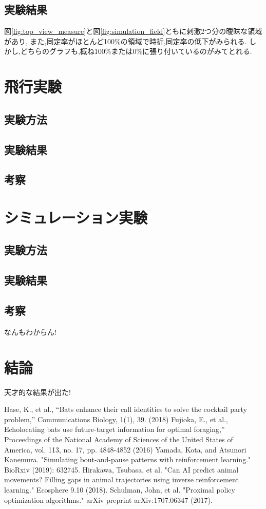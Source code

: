 \documentclass{jsreport}
\begin{document}
\newpage
\section{実験結果}
  図\ref{fig:top_view_measure}と図\ref{fig:simulation_field}ともに刺激2つ分の曖昧な領域があり,
  また,同定率がほとんど100\%の領域で時折,同定率の低下がみられる.
  しかし,どちらのグラフも,概ね100\%または0\%に張り付いているのがみてとれる.

\newpage
\chapter{飛行実験}
\section{実験方法}
\section{実験結果}
\section{考察}

\newpage
\chapter{シミュレーション実験}
\section{実験方法}
\section{実験結果}
\section{考察}
なんもわからん!

\newpage
\chapter{結論}
天才的な結果が出た!

\begin{thebibliography}{99}
    Hase, K., et al., “Bats enhance their call identities to solve the cocktail party problem,” Communications Biology, 1(1), 39. (2018)
    Fujioka, E., et al., Echolocating bats use future-target information for optimal foraging,” Proceedings of the National Academy of Sciences of the United States of America, vol. 113, no. 17, pp. 4848-4852 (2016)
    Yamada, Kota, and Atsunori Kanemura. "Simulating bout-and-pause patterns with reinforcement learning." BioRxiv (2019): 632745.
    Hirakawa, Tsubasa, et al. "Can AI predict animal movements? Filling gaps in animal trajectories using inverse reinforcement learning." Ecosphere 9.10 (2018).
    Schulman, John, et al. "Proximal policy optimization algorithms." arXiv preprint arXiv:1707.06347 (2017).
\end{thebibliography}
\end{document}
